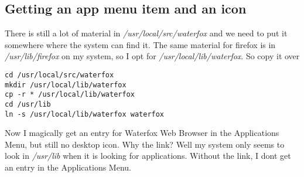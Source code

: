 \documentclass{article}  %
\begin{document}
\subsection{Getting an app menu item and an icon}
There is still a lot of material in {\em /usr/local/src/waterfox} and we need to put it somewhere where the system can find it. The same material for firefox is in {\em /usr/lib/firefox} on my system, so I opt for {\em /usr/local/lib/waterfox}. So copy it over
\begin{verbatim}
cd /usr/local/src/waterfox
mkdir /usr/local/lib/waterfox
cp -r * /usr/local/lib/waterfox
cd /usr/lib
ln -s /usr/local/lib/waterfox waterfox
\end{verbatim}
Now I magically get an entry for Waterfox Web Browser in the Applications Menu, but still no desktop icon. Why the link?  Well  my system only seems to look in {\em /usr/lib} when it is looking for applications. Without the link, I dont get an entry in the Applications Menu.
\end{document}
